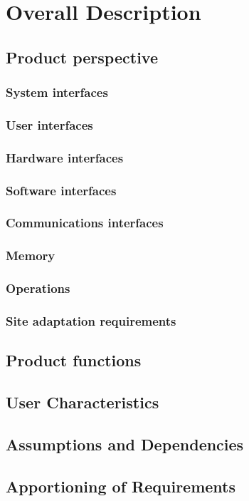 \chapter{Overall Description}
\section{Product perspective}

\subsection{System interfaces}
\subsection{User interfaces}
\subsection{Hardware interfaces}
\subsection{Software interfaces}
\subsection{Communications interfaces}
\subsection{Memory}
\subsection{Operations}
\subsection{Site adaptation requirements}

\section{Product functions}

\section{User Characteristics}




\section{Assumptions and Dependencies}
\section{Apportioning of Requirements}
